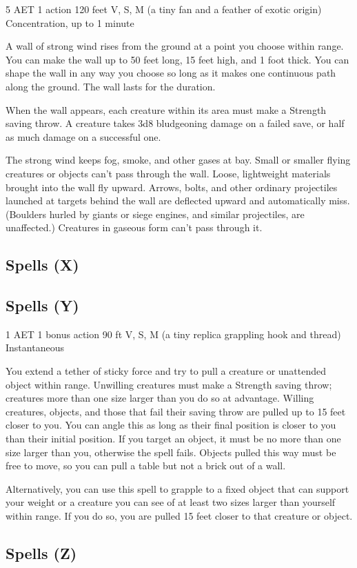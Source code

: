 {5 AET}
{1 action}
{120 feet}
{V, S, M (a tiny fan and a feather of exotic origin)}
{Concentration, up to 1 minute}

A wall of strong wind rises from the ground at a point you choose within range. You can make the wall up to 50 feet long, 15 feet high, and 1 foot thick. You can shape the wall in any way you choose so long as it makes one continuous path along the ground. The wall lasts for the duration.

When the wall appears, each creature within its area must make a Strength saving throw. A creature takes 3d8 bludgeoning damage on a failed save, or half as much damage on a successful one.

The strong wind keeps fog, smoke, and other gases at bay. Small or smaller flying creatures or objects can't pass through the wall. Loose, lightweight materials brought into the wall fly upward. Arrows, bolts, and other ordinary projectiles launched at targets behind the wall are deflected upward and automatically miss. (Boulders hurled by giants or siege engines, and similar projectiles, are unaffected.) Creatures in gaseous form can't pass through it.

\subsection{Spells (X)}

\subsection{Spells (Y)}
{1 AET}
{1 bonus action}
{90 ft}
{V, S, M (a tiny replica grappling hook and thread)}
{Instantaneous}

You extend a tether of sticky force and try to pull a creature or unattended object within range. Unwilling creatures must make a Strength saving throw; creatures more than one size larger than you do so at advantage. Willing creatures, objects, and those that fail their saving throw are pulled up to 15 feet closer to you. You can angle this as long as their final position is closer to you than their initial position. If you target an object, it must be no more than one size larger than you, otherwise the spell fails. Objects pulled this way must be free to move, so you can pull a table but not a brick out of a wall.

Alternatively, you can use this spell to grapple to a fixed object that can support your weight or a creature you can see of at least two sizes larger than yourself within range. If you do so, you are pulled 15 feet closer to that creature or object.

\subsection{Spells (Z)}